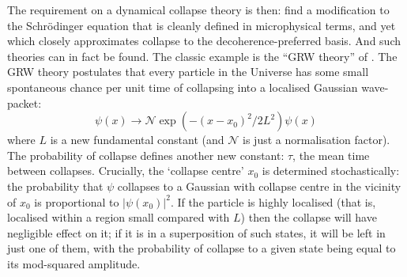 \documentclass[12pt]{article}
\newcommand{\be}{\begin{equation}}
\newcommand{\ee}{\end{equation}}
\newcommand{\mc}[1]{\ensuremath{\mathcal{#1}}}
\begin{document}
The requirement on a dynamical collapse theory is then: find a modification to the Schr\"{o}dinger equation that is cleanly defined in microphysical terms, and yet which closely approximates collapse to the decoherence-preferred basis. And such theories can in fact be found. The classic example is the ``GRW theory'' of .  The GRW theory postulates that every particle in the Universe has some small spontaneous chance per unit time of collapsing into a localised Gaussian wave-packet:
\be\label{DMWWgrw}
\psi(x)\longrightarrow \mc{N}\exp(-(x-x_0)^2/2L^2) \psi(x)
\ee 
where $L$ is a new fundamental constant (and \mc{N} is just a normalisation factor). The probability of collapse defines another new constant: $\tau$, the mean time between collapses. Crucially, the `collapse centre' $x_0$ is determined stochastically: the probability that $\psi$ collapses to a Gaussian with collapse centre in the vicinity of $x_0 $ is proportional to $|\psi(x_0)|^2$. If the particle is highly localised (that is, localised within a region small compared with $L$) then the collapse will have negligible effect on it; if it is in a superposition of such states, it will  be left in just one of them, with the probability of collapse to a given state being equal to its mod-squared amplitude.
\end{document}
